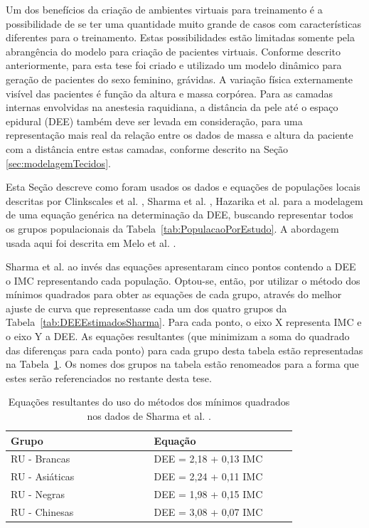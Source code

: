 Um dos benefícios da criação de ambientes virtuais para treinamento é a possibilidade de se ter uma quantidade muito grande de casos com características diferentes para o treinamento. Estas possibilidades estão limitadas somente pela abrangência do modelo para criação de pacientes virtuais. Conforme descrito anteriormente, para esta tese foi criado e utilizado um modelo dinâmico para geração de pacientes do sexo feminino, grávidas. A variação física externamente visível das pacientes é função da altura e massa corpórea. Para as camadas internas envolvidas na anestesia raquidiana, a distância da pele até o espaço epidural (\acrshort{DEE}) também deve ser levada em consideração, para uma representação mais real da relação entre os dados de massa e altura da paciente com a distância entre estas camadas, conforme descrito na Seção \ref{sec:modelagemTecidos}. 

Esta Seção descreve como foram usados os dados e equações de populações locais descritas por Clinkscales et al. \cite{Clinkscales2007}, Sharma et al. \cite{Sharma2011}, Hazarika et al. \cite{Hazarika2016} para a modelagem de uma equação genérica na determinação da \acrshort{DEE}, buscando representar todos os grupos populacionais da Tabela~\ref{tab:PopulacaoPorEstudo}.
A abordagem usada aqui foi descrita em Melo et al. \cite{Melo2020}.

Sharma et al. \cite{Sharma2011} ao invés das equações apresentaram cinco pontos contendo a \acrshort{DEE} o \acrshort{IMC} representando cada população. Optou-se, então, por utilizar o método dos mínimos quadrados para obter as equações de cada grupo, através do melhor ajuste de curva que representasse cada um dos quatro grupos da Tabela~\ref{tab:DEEEstimadosSharma}. Para cada ponto, o eixo X representa \acrshort{IMC} e o eixo Y a \acrshort{DEE}. As equações resultantes (que minimizam a soma do quadrado das diferenças para cada ponto) para cada grupo desta tabela estão representadas na Tabela~\ref{tab:DEEEquacoesMinimosQuadrados}. Os nomes dos grupos na tabela estão renomeados para a forma que estes serão referenciados no restante desta tese.

\begin{table}[!ht]
\begin{center}
\caption{Equações resultantes do uso do métodos dos mínimos quadrados nos dados de Sharma et al. \cite{Sharma2011}.}
\label{tab:DEEEquacoesMinimosQuadrados}
\begin{tabular}{|p{0.4\linewidth}|p{0.4\linewidth}|}
\hline
\textbf{Grupo} & \textbf{Equação}\\
\hline\hline
RU - Brancas & DEE = 2,18 + 0,13 IMC\\
RU - Asiáticas & DEE = 2,24 + 0,11 IMC\\
RU - Negras & DEE = 1,98 + 0,15 IMC\\
RU - Chinesas & DEE = 3,08 + 0,07 IMC\\
\hline
\end{tabular}
\end{center}
\end{table}

